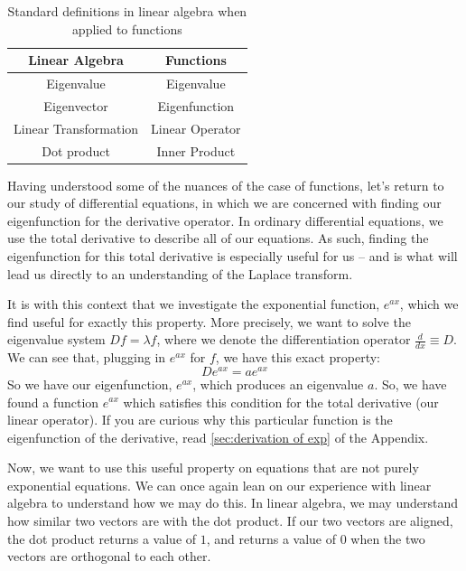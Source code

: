 \begin{table}
    \centering
\caption{Standard definitions in linear algebra when applied to functions}
\label{tab:lin alg to func}
    \begin{tabular}{cc}\toprule
         \textbf{Linear Algebra}&  \textbf{Functions}\\\midrule
         Eigenvalue&  Eigenvalue\\
         Eigenvector&  Eigenfunction\\
 Linear Transformation&Linear Operator\\
 Dot product&Inner Product\\ \bottomrule
    \end{tabular}
    
    
\end{table}

Having understood some of the nuances of the case of functions, let's return to our study of differential equations, in which we are concerned with finding our eigenfunction for the derivative operator. In ordinary differential equations, we use the total derivative to describe all of our equations. As such, finding the eigenfunction for this total derivative is especially useful for us -- and is what will lead us directly to an understanding of the Laplace transform.

It is with this context that we investigate the exponential function, $e^{ax}$, which we find useful for exactly this property. More precisely, we want to solve the eigenvalue system $Df=\lambda f$, where we denote the differentiation operator $\frac{d}{dx}\equiv D$. We can see that, plugging in $e^{ax}$ for $f$, we have this exact property:
$$De^{ax}=ae^{ax}$$
So we have our eigenfunction, $e^{ax}$, which produces an eigenvalue $a$. So, we have found a function $e^{ax}$ which satisfies this condition for the total derivative (our linear operator). If you are curious why this particular function is the eigenfunction of the derivative, read \autoref{sec:derivation of exp} of the Appendix.

Now, we want to use this useful property on equations that are not purely exponential equations. We can once again lean on our experience with linear algebra to understand how we may do this. In linear algebra, we may understand how similar two vectors are with the dot product. If our two vectors are aligned, the dot product returns a value of $1$, and returns a value of $0$ when the two vectors are orthogonal to each other.

